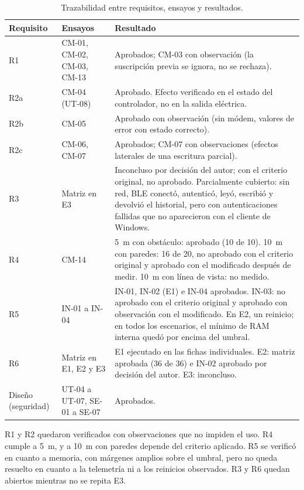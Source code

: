 \begin{table}[htbp]
\centering
\caption{Trazabilidad entre requisitos, ensayos y resultados.}
\label{tab:trazabilidad}
\footnotesize
\setlength{\tabcolsep}{4pt}
\begin{tabular}{L{0.12\textwidth} L{0.21\textwidth} L{0.56\textwidth}}
\toprule
\textbf{Requisito} & \textbf{Ensayos} & \textbf{Resultado} \\
\midrule
R1 & CM-01, CM-02, CM-03, CM-13 & Aprobados; CM-03 con observación (la suscripción previa se ignora, no se rechaza). \\
R2a & CM-04 (UT-08) & Aprobado. Efecto verificado en el estado del controlador, no en la salida eléctrica. \\
R2b & CM-05 & Aprobado con observación (sin módem, valores de error con estado correcto). \\
R2c & CM-06, CM-07 & Aprobados; CM-07 con observaciones (efectos laterales de una escritura parcial). \\
R3 & Matriz en E3 & Inconcluso por decisión del autor; con el criterio original, no aprobado. Parcialmente cubierto: sin red, BLE conectó, autenticó, leyó, escribió y devolvió el historial, pero con autenticaciones fallidas que no aparecieron con el cliente de Windows. \\
R4 & CM-14 & 5~m con obstáculo: aprobado (10 de 10). 10~m con paredes: 16 de 20, no aprobado con el criterio original y aprobado con el modificado después de medir. 10~m con línea de vista: no medido. \\
R5 & IN-01 a IN-04 & IN-01, IN-02 (E1) e IN-04 aprobados. IN-03: no aprobado con el criterio original y aprobado con observación con el modificado. En E2, un reinicio; en todos los escenarios, el mínimo de RAM interna quedó por encima del umbral. \\
R6 & Matriz en E1, E2 y E3 & E1 ejecutado en las fichas individuales. E2: matriz aprobada (36 de 36) e IN-02 aprobado por decisión del autor. E3: inconcluso. \\
Diseño (seguridad) & UT-04 a UT-07, SE-01 a SE-07 & Aprobados. \\
\bottomrule
\end{tabular}
\end{table}

R1 y R2 quedaron verificados con observaciones que no impiden el uso. R4 cumple a 5~m, y a 10~m con paredes depende del criterio aplicado. R5 se verificó en cuanto a memoria, con márgenes amplios sobre el umbral, pero no queda resuelto en cuanto a la telemetría ni a los reinicios observados. R3 y R6 quedan abiertos mientras no se repita E3.

